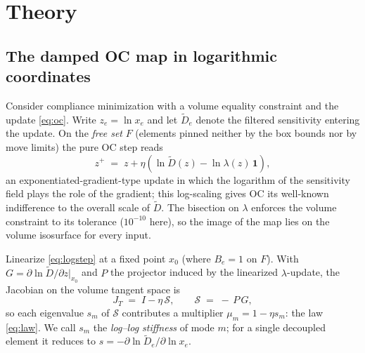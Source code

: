 \documentclass[11pt,a4paper]{article}
\newcommand{\Dfilt}{\tilde{D}}
\begin{document}
\section{Theory}\label{sec:theory}

\subsection{The damped OC map in logarithmic coordinates}

Consider compliance minimization with a volume equality constraint and the
update \eqref{eq:oc}. Write $z_e=\ln x_e$ and let $\Dfilt_e$ denote the
filtered sensitivity entering the update. On the \emph{free set} $F$
(elements pinned neither by the box bounds nor by move limits) the pure OC
step reads
\begin{equation}
  z^{+} \;=\; z + \eta\left(\ln \Dfilt(z) - \ln\lambda(z)\,\mathbf 1\right),
  \label{eq:logstep}
\end{equation}
an exponentiated-gradient-type update in which the logarithm of the
sensitivity field plays the role of the gradient; this log-scaling gives OC
its well-known indifference to the overall scale of $\Dfilt$. The
bisection on $\lambda$ enforces the volume constraint to its tolerance
($10^{-10}$ here), so the image of the map lies on the volume isosurface
for every input.

Linearize \eqref{eq:logstep} at a fixed point $x_0$ (where $B_e=1$ on $F$).
With $G=\partial\ln\Dfilt/\partial z|_{x_0}$ and $P$ the projector induced
by the linearized $\lambda$-update, the Jacobian on the volume tangent
space is
\begin{equation}
  J_T \;=\; I-\eta\,\mathcal S,
  \qquad
  \mathcal S \;=\; -\,P\,G ,
  \label{eq:JT}
\end{equation}
so each eigenvalue $s_m$ of $\mathcal S$ contributes a multiplier
$\mu_m=1-\eta s_m$: the law \eqref{eq:law}. We call $s_m$ the
\emph{log--log stiffness} of mode $m$; for a single decoupled element it
reduces to $s=-\partial\ln\Dfilt_e/\partial\ln x_e$.
\end{document}

